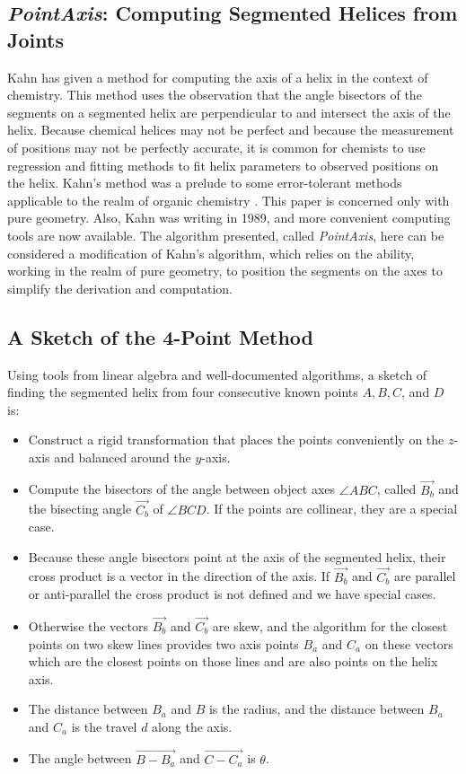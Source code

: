 \documentclass[mathematics,article,submit,pdftex,moreauthors]{Definitions/mdpi}
\begin{document}
\subsection{{\em PointAxis}: Computing Segmented Helices from Joints}
\label{sec:pointaxis}

Kahn \cite{kahn1989defining} has given a method for computing
the axis of a helix in the context of chemistry.
This method uses the observation that the angle bisectors
of the segments on a segmented helix are perpendicular to
and intersect the axis of the helix.
Because chemical helices may not be perfect and because the measurement of positions may not be perfectly accurate,
it is common for chemists to use regression and fitting methods to fit helix parameters to observed positions
on the helix.
Kahn's method was a prelude to some error-tolerant methods applicable to
the realm of organic chemistry \cite{enkhbayar2008helfit}.
This paper is concerned only with pure geometry. Also, Kahn was writing in 1989,
and more convenient computing tools are now available.
The algorithm presented, called {\em PointAxis}, here can be considered a modification of Kahn's algorithm,
which relies on the ability, working in the realm of pure geometry, to position the segments on the axes
to simplify the derivation and computation.

\subsection{A Sketch of the 4-Point Method}

Using tools from linear algebra and well-documented algorithms, a sketch of finding the segmented helix from
four consecutive known points $A,B,C$, and $D$ is:
\begin{itemize}
\item Construct a rigid transformation that places the points conveniently on the $z$-axis and balanced
  around the $y$-axis.
\item Compute the bisectors of the angle between object axes $ \angle{ABC}$, called $\overrightarrow{B_b}$ and the
  bisecting angle $\overrightarrow{C_b}$ of $\angle{BCD}$.
  If the points are collinear, they are a special case.
\item Because these angle bisectors point at the axis of the segmented helix, their cross product is a vector
  in the direction of the axis. If $\overrightarrow{B_b}$ and $\overrightarrow{C_b}$ are parallel or anti-parallel the cross product is not defined
  and we have special cases.
\item  Otherwise the vectors $\overrightarrow{B_b}$ and $\overrightarrow{C_b}$ are skew, and the algorithm for the closest points on
  two skew lines provides two axis points $B_a$ and $C_a$ on these vectors which
  are the closest points on those lines and are also points on the helix axis.
\item The distance between $B_a$ and $B$ is the radius, and the distance between $B_a$ and $C_a$ is the travel $d$ along the axis.
  \item The angle between $\overrightarrow{B - B_a}$ and $\overrightarrow{C - C_a}$ is $\theta$.
\end{itemize}
\end{document}
